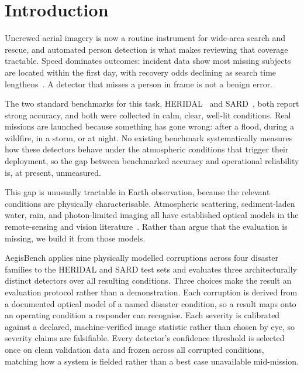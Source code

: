 \section{Introduction}
\label{sec:intro}

Uncrewed aerial imagery is now a routine instrument for wide-area search
and rescue, and automated person detection is what makes reviewing that
coverage tractable. Speed dominates outcomes: incident data show most
missing subjects are located within the first day, with recovery odds
declining as search time lengthens~\cite{koester2008lost}. A detector
that misses a person in frame is not a benign error.

The two standard benchmarks for this task, HERIDAL~\cite{bozic2019heridal}
and SARD~\cite{sambolek2021sard}, both report strong accuracy, and both
were collected in calm, clear, well-lit conditions. Real missions are
launched because something has gone wrong: after a flood, during a
wildfire, in a storm, or at night. No existing benchmark systematically
measures how these detectors behave under the atmospheric conditions
that trigger their deployment, so the gap between benchmarked accuracy
and operational reliability is, at present, unmeasured.

This gap is unusually tractable in Earth observation, because the
relevant conditions are physically characterisable. Atmospheric
scattering, sediment-laden water, rain, and photon-limited imaging all
have established optical models in the remote-sensing and vision
literature~\cite{koschmieder1924theorie,narasimhan2002vision,garg2007rain,chen2018dark}.
Rather than argue that the evaluation is missing, we build it from those
models.

AegisBench applies nine physically modelled corruptions across four
disaster families to the HERIDAL and SARD test sets and evaluates three
architecturally distinct detectors over all resulting conditions. Three
choices make the result an evaluation protocol rather than a
demonstration. Each corruption is derived from a documented optical
model of a named disaster condition, so a result maps onto an operating
condition a responder can recognise. Each severity is calibrated against
a declared, machine-verified image statistic rather than chosen by eye,
so severity claims are falsifiable. Every detector's confidence
threshold is selected once on clean validation data and frozen across
all corrupted conditions, matching how a system is fielded rather than a
best case unavailable mid-mission.

